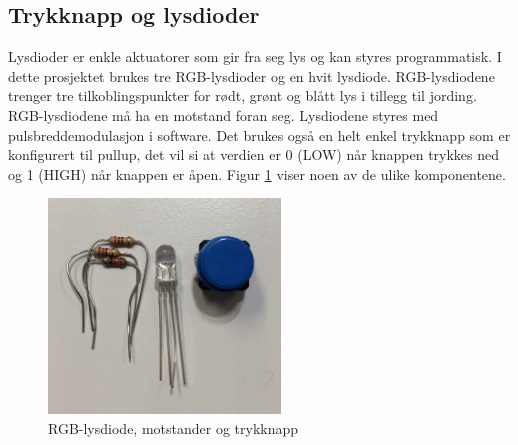 \subsection{Trykknapp og lysdioder}
Lysdioder er enkle aktuatorer som gir fra seg lys og kan styres programmatisk. I dette prosjektet brukes tre RGB-lysdioder og en hvit lysdiode.
RGB-lysdiodene trenger tre tilkoblingspunkter
for rødt, grønt og blått lys i tillegg til jording. RGB-lysdiodene må ha en motstand foran seg. Lysdiodene styres med pulsbreddemodulasjon i software.
Det brukes også en helt enkel trykknapp som er konfigurert til pullup, det vil si at verdien er 0 (LOW) når knappen trykkes ned
og 1 (HIGH) når knappen er åpen. Figur \ref{fig:lysdioder_motstander} viser noen av de ulike komponentene.

\begin{figure}
\includegraphics[width=0.55\textwidth, center]{fig/prototype/ledmotstandknapp}
\caption{RGB-lysdiode, motstander og trykknapp}
\label{fig:lysdioder_motstander}
\end{figure}
